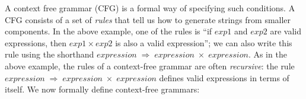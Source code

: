 A context free grammar (CFG) is a formal way of specifying such
conditions. A CFG consists of a set of \emph{rules} that tell us how to
generate strings from smaller components. In the above example, one of
the rules is ``if \(exp1\) and \(exp2\) are valid expressions, then
\(exp1 \times exp2\) is also a valid expression''; we can also write
this rule using the shorthand
\(expression \; \Rightarrow \; expression \; \times \; expression\). As
in the above example, the rules of a context-free grammar are often
\emph{recursive}: the rule
\(expression \; \Rightarrow\; expression \; \times \; expression\)
defines valid expressions in terms of itself. We now formally define
context-free grammars:

\hypertarget{defcfg}{}

